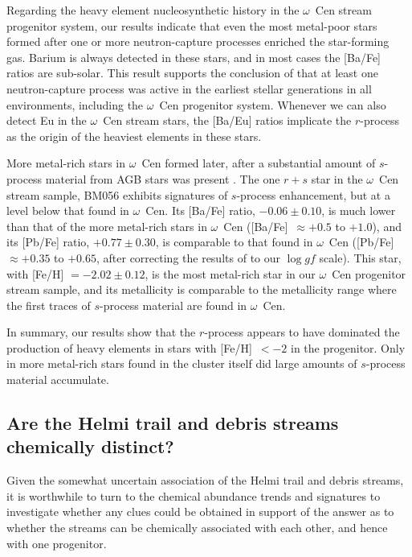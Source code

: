 \documentclass[twocolumn]{aastex63}
\begin{document}
Regarding the heavy element nucleosynthetic history in the $\omega$~Cen stream progenitor system, our results indicate that even the most metal-poor stars  formed after one or more neutron-capture processes enriched the star-forming gas.
Barium is always detected in these stars, and in most cases the [Ba/Fe] ratios are sub-solar.
This result supports the conclusion of \citet{roederer13} that at least one neutron-capture process was active in the earliest stellar generations in all environments, including the $\omega$~Cen progenitor system.
Whenever we can also detect Eu in the $\omega$~Cen stream stars, the [Ba/Eu] ratios implicate the $r$-process as the origin of the heaviest elements in these stars.

More metal-rich stars in $\omega$~Cen formed later, after a substantial amount of $s$-process material from AGB stars was present \citep{smith00,Johnson10,marino11,pancino11b}.
The one $r+s$ star in the $\omega$~Cen stream sample, BM056
exhibits signatures of $s$-process enhancement, but at a level below that found in $\omega$~Cen.
Its \mbox{[Ba/Fe]} ratio, $-0.06 \pm 0.10$, is much lower than that of the more metal-rich stars in $\omega$~Cen (\mbox{[Ba/Fe]}~$\approx +0.5$ to $+1.0$), and its \mbox{[Pb/Fe]} ratio, $+0.77 \pm 0.30$, is comparable to that found in $\omega$~Cen (\mbox{[Pb/Fe]}~$\approx +0.35$ to $+0.65$, after correcting the results of \citealt{dorazi11} to our $\log gf$ scale).
This star, with \mbox{[Fe/H]} $= -2.02 \pm 0.12$, is the most metal-rich star in our $\omega$~Cen progenitor stream sample, and its metallicity is comparable to the metallicity range where the first traces of $s$-process material are found in $\omega$~Cen.

In summary, our results show that the $r$-process appears to have dominated the production of heavy elements in stars with \mbox{[Fe/H]}~$< -2$ in the progenitor. 
Only in more metal-rich stars found in the cluster itself did large amounts of $s$-process material accumulate.










\subsection{Are the Helmi trail and debris streams chemically distinct?}\label{distinct}

Given the somewhat uncertain association of the Helmi trail and debris streams, it is worthwhile to turn to the chemical abundance trends and signatures to investigate whether any clues could be obtained in support of the answer as to whether the streams can be chemically associated with each other, and hence with one progenitor.
\end{document}
